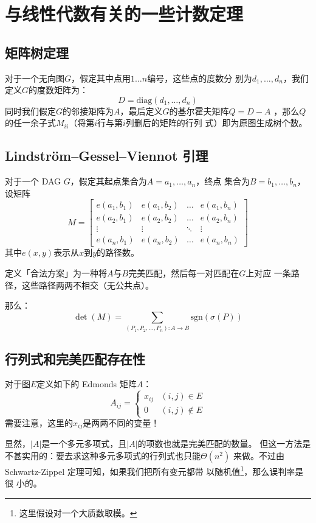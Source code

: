 \section{与线性代数有关的一些计数定理}
\subsection{矩阵树定理}
对于一个无向图$G$，假定其中点用$1\ldots n$编号，这些点的度数分
别为$d_1,\ldots,d_n$，我们定义$G$的度数矩阵为：
\[D=\text{diag}(d_1,\ldots,d_n)\]
同时我们假定$G$的邻接矩阵为$A$，最后定义$G$的基尔霍夫矩阵$Q=D-A$
，那么$Q$的任一余子式$M_{ii}$（将第$i$行与第$i$列删后的矩阵的行列
式）即为原图生成树个数。

\subsection{Lindström–Gessel–Viennot 引理}
对于一个 DAG $G$，假定其起点集合为$A={a_1,\ldots,a_n}$，终点
集合为$B={b_1,\ldots,b_n}$，设矩阵
\[M=\begin{bmatrix}
  e(a_1, b_1) & e(a_1, b_2) & \ldots & e(a_1, b_n)\\
  e(a_2, b_1) & e(a_2, b_2) & \ldots & e(a_2, b_n)\\
  \vdots      & \vdots      & \ddots & \vdots     \\
  e(a_n, b_1) & e(a_n, b_2) & \ldots & e(a_n, b_n)
\end{bmatrix}\]
其中$e(x, y)$表示从$x$到$y$的路径数。\par
定义「合法方案」为一种将$A$与$B$完美匹配，然后每一对匹配在$G$上对应
一条路径，这些路径两两不相交（无公共点）。\par
那么：
\[\det(M)=\sum_{(P_1,P_2,\ldots,P_n):A\to B}\text{sgn}(\sigma(P))\]

\subsection{行列式和完美匹配存在性}
对于图$E$定义如下的 Edmonds 矩阵$A$：
\[A_{ij}=\begin{cases}
  x_{ij} & (i,j)\in E\\
  0      & (i,j)\notin E
\end{cases}\]
需要注意，这里的$x_{ij}$是两两不同的变量！\par
显然，$|A|$是一个多元多项式，且$|A|$的项数也就是完美匹配的数量。
但这一方法是不甚实用的：要去求这种多元多项式的行列式也只能$\Theta(n^2)$
来做。不过由 Schwartz-Zippel 定理可知，如果我们把所有变元都带
以随机值\footnote{这里假设对一个大质数取模。}，那么误判率是很
小的。